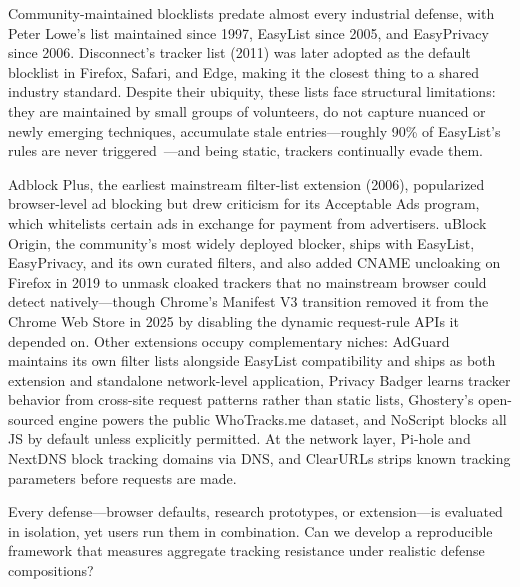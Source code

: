 %
Community-maintained blocklists predate almost every industrial defense, with Peter Lowe's list maintained since 1997, EasyList since 2005, and EasyPrivacy since 2006.
%
Disconnect's tracker list (2011) was later adopted as the default blocklist in Firefox, Safari, and Edge, making it the closest thing to a shared industry standard.
%
Despite their ubiquity, these lists face structural limitations: they are maintained by small groups of volunteers, do not capture nuanced or newly emerging techniques, accumulate stale entries---roughly 90\% of EasyList's rules are never triggered~\cite{snyderWhoFiltersFilters2020}---and being static, trackers continually evade them.


%
Adblock Plus, the earliest mainstream filter-list extension (2006), popularized browser-level ad blocking but drew criticism for its Acceptable Ads program, which whitelists certain ads in exchange for payment from advertisers.
%
uBlock Origin, the community's most widely deployed blocker, ships with EasyList, EasyPrivacy, and its own curated filters, and also added CNAME uncloaking on Firefox in 2019 to unmask cloaked trackers that no mainstream browser could detect natively---though Chrome's Manifest V3 transition removed it from the Chrome Web Store in 2025 by disabling the dynamic request-rule APIs it depended on.
%
Other extensions occupy complementary niches: AdGuard maintains its own filter lists alongside EasyList compatibility and ships as both extension and standalone network-level application, Privacy Badger learns tracker behavior from cross-site request patterns rather than static lists, Ghostery's open-sourced engine powers the public WhoTracks.me dataset, and NoScript blocks all JS by default unless explicitly permitted.
%
At the network layer, Pi-hole and NextDNS block tracking domains via DNS, and ClearURLs strips known tracking parameters before requests are made.


\begin{opbox}
Every defense---browser defaults, research prototypes, or extension---is evaluated in isolation, %
yet users run them in combination. 
Can we develop a reproducible framework that measures aggregate tracking resistance under realistic defense compositions?
\end{opbox}


